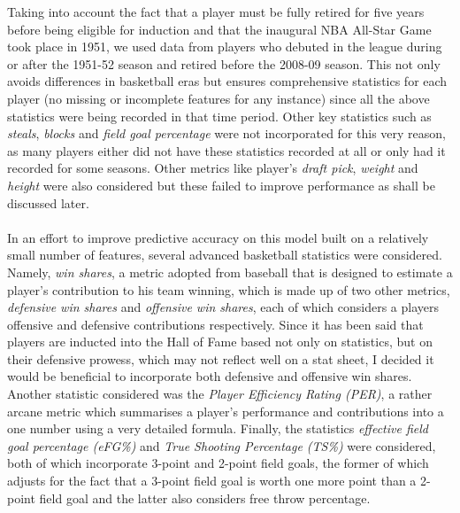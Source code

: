 \documentclass[paper=a4, fontsize=11pt]{scrartcl} %
\numberwithin{equation}{section} %
\numberwithin{figure}{section} %
\numberwithin{table}{section} %
\begin{document}
Taking into account the fact that a player must be fully retired for five years before being eligible for induction\cite{hof_guidelines} and that the inaugural NBA All-Star Game took place in 1951, we used data from players who debuted in the league during or after the 1951-52 season and retired before the 2008-09 season. This not only avoids differences in basketball eras but ensures comprehensive statistics for each player (no missing or incomplete features for any instance) since all the above statistics were being recorded in that time period. Other key statistics such as \textit{steals}, \textit{blocks} and \textit{field goal percentage} were not incorporated for this very reason, as many players either did not have these statistics recorded at all or only had it recorded for some seasons. Other metrics like player's \textit{draft pick}, \textit{weight} and \textit{height} were also considered but these failed to improve performance as shall be discussed later.\\ %
\\
In an effort to improve predictive accuracy on this model built on a relatively small number of features, several advanced basketball statistics were considered. Namely, \textit{win shares}, a metric adopted from baseball that is designed to estimate a player's contribution to his team winning, which is made up of two other metrics, \textit{defensive win shares} and \textit{offensive win shares}, each of which considers a players offensive and defensive contributions respectively. Since it has been said that players are inducted into the Hall of Fame based not only on statistics, but on their defensive prowess, which may not reflect well on a stat sheet, I decided it would be beneficial to incorporate both defensive and offensive win shares. Another statistic considered was the \textit{Player Efficiency Rating (PER)}, a rather arcane metric which summarises a player's performance and contributions into a one number using a very detailed formula. Finally, the statistics \textit{effective field goal percentage (eFG\%)} and \textit{True Shooting Percentage (TS\%)} were considered, both of which incorporate 3-point and 2-point field goals, the former of which adjusts for the fact that a 3-point field goal is worth one more point than a 2-point field goal and the latter also considers free throw percentage.\\
\\
\end{document}
